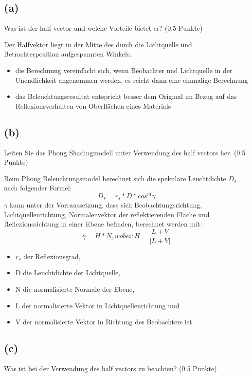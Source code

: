 \documentclass[12pt]{scrreprt}
\begin{document}
\subsection*{(a)}
Was ist der half vector und welche Vorteile bietet er? (0.5 Punkte)

Der Halfvektor liegt in der Mitte des durch die Lichtquelle und Betrachterposition aufgespannten Winkels.

\begin{itemize}
  \item die Berechnung vereinfacht sich, wenn Beobachter und
    Lichtquelle in der Unendlichkeit angenommen werden, es reicht dann
    eine einmalige Berechnung
  \item das Beleuchtungsresultat entspricht besser dem Original im
    Bezug auf das Reflexionsverhalten von Oberflächen eines Materials
\end{itemize}

\subsection*{(b)}
Leiten Sie das Phong Shadingmodell unter Verwendung des half vectors her. (0.5 Punkte)

Beim Phong Beleuchtungsmodel berechnet sich die spekuläre Leuchtdichte \(D_s\)
nach folgender Formel:
\[
D_s = r_s * D * cos^m \gamma
\]
\(\gamma\) kann unter der Vorraussetzung, dass sich Beobachtungsrichtung,
Lichtquellenrichtung, Normalenvektor der reflektierenden Fläche und
Reflexionsrichtung in einer Ebene befinden, berechnet werden mit:
\[
\gamma = H * N, wobei:  H = \frac{L + V}{|L + V|}
\]

\begin{itemize}
  \item \(r_s\) der Reflexionsgrad,
  \item D die Leuchtdichte der Lichtquelle,
  \item N die normalisierte Normale der Ebene,
  \item L der normalisierte Vektor in Lichtquellenrichtung und
  \item V der normalisierte Vektor in Richtung des Beobachters ist
\end{itemize}


\subsection*{(c)}
Was ist bei der Verwendung des half vectors zu beachten? (0.5 Punkte)
\end{document}
